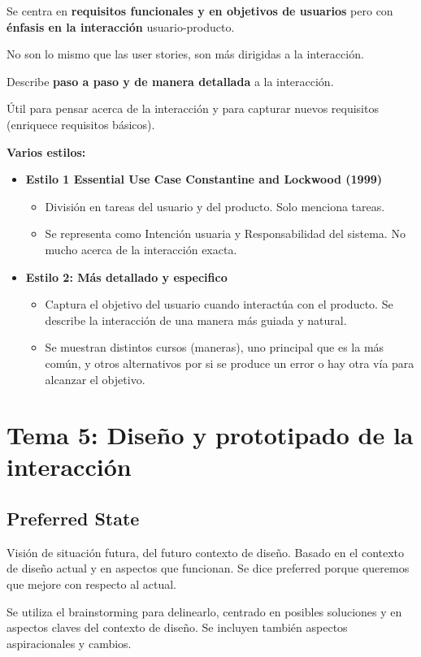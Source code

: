 \documentclass[12pt]{report} %
\begin{document}
Se centra en \textbf{requisitos funcionales y en objetivos de usuarios} pero
con \textbf{énfasis en la interacción} usuario-producto.

No son lo mismo que las user stories, son más dirigidas a la
interacción.

Describe \textbf{paso a paso y de manera detallada} a la interacción.

Útil para pensar acerca de la interacción y para capturar nuevos
requisitos (enriquece requisitos básicos).

\textbf{Varios estilos:}

\begin{itemize}
	\item \textbf{Estilo 1 Essential Use Case Constantine and Lockwood (1999)}
		\begin{itemize}
			\item División en tareas del usuario y del producto. Solo menciona tareas.
			\item Se representa como Intención usuaria y Responsabilidad del sistema. No mucho acerca de la interacción exacta.
		\end{itemize}
	\item \textbf{Estilo 2: Más detallado y especifico}
		\begin{itemize}
			\item Captura el objetivo del usuario cuando interactúa con el producto. Se describe la interacción de una manera más guiada y natural.
			\item Se muestran distintos cursos (maneras), uno principal que es la más común, y otros alternativos por si se produce un error o hay otra vía para alcanzar el objetivo.
		\end{itemize}
\end{itemize}

\chapter{Tema 5: Diseño y prototipado de la interacción}

\section{Preferred State}
Visión de situación futura, del futuro contexto de diseño. Basado en el contexto de diseño actual y en aspectos que funcionan. Se dice preferred porque queremos que mejore con respecto al actual.

Se utiliza el brainstorming para delinearlo, centrado en posibles soluciones y en aspectos claves del contexto de diseño. Se incluyen también aspectos aspiracionales y cambios.
\end{document}
